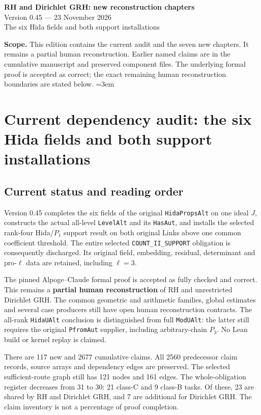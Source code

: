 \documentclass[11pt,a4paper]{article}
\numberwithin{equation}{section}
\theoremstyle{remark}\newtheorem{remark}[theorem]{Remark}
\begin{document}
\begin{center}
{\LARGE\bfseries RH and Dirichlet GRH: new reconstruction chapters}\\[7pt]
{\large Version 0.45 --- 23 November 2026}\\[5pt]
{\large The six Hida fields and both support installations}
\end{center}
\textbf{Scope.} This edition contains the current audit and the seven new
chapters. It remains a partial human reconstruction. Earlier named
claims are in the cumulative manuscript and preserved component files.
The underlying formal proof is accepted as correct; the exact remaining
human reconstruction boundaries are stated below.
\setcounter{tocdepth}{1}
\tableofcontents
\clearpage
\begingroup\emergencystretch=3em
\section{Current dependency audit: the six Hida fields and both support installations}
\label{sec:dependency-audit-v45}

\subsection{Current status and reading order}

Version 0.45 completes the six fields of the original
\texttt{Hida\allowbreak Props\allowbreak Alt} on one ideal $J$, constructs the actual
all-level \texttt{Level\allowbreak Alt} and its \texttt{Has\allowbreak Aut}, and installs
the selected rank-four Hida/$P_1$ support result on both original
Links above one common coefficient threshold.  The entire selected
\texttt{COUNT\_\allowbreak II\_\allowbreak SUPPORT} obligation is consequently discharged.
Its original field, embedding, residual, determinant and
pro-$\ell$ data are retained, including $\ell=3$.

The pinned Alpoge--Claude formal proof is accepted as fully checked
and correct.  This remains a \textbf{partial human reconstruction}
of RH and unrestricted Dirichlet GRH.  The common geometric and
arithmetic families, global estimates and several case producers
still have open human reconstruction contracts.  The all-rank
\texttt{Hida\allowbreak UAlt} conclusion is distinguished from full
\texttt{Mod\allowbreak UAlt}: the latter still requires the original
\texttt{Pfrom\allowbreak Aut} supplier, including arbitrary-chain $P_3$.
No Lean build or kernel replay is claimed.

There are 117 new and 2677 cumulative claims.  All 2560
predecessor claim records, source arrays and dependency edges are
preserved.  The selected sufficient-route graph still has 121 nodes
and 161 edges.  The whole-obligation register decreases from 31 to
30: 21 class-C and 9 class-B tasks.  Of these, 23 are shared by RH
and Dirichlet GRH, and 7 are additional for Dirichlet GRH.  The
claim inventory is not a percentage of proof completion.
\end{document}
